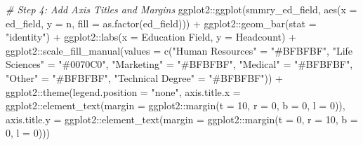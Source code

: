 \documentclass[
]{book}
\newenvironment{Shaded}{\begin{snugshade}}{\end{snugshade}}
\newcommand{\AttributeTok}[1]{\textcolor[rgb]{0.77,0.63,0.00}{#1}}
\newcommand{\CommentTok}[1]{\textcolor[rgb]{0.56,0.35,0.01}{\textit{#1}}}
\newcommand{\DecValTok}[1]{\textcolor[rgb]{0.00,0.00,0.81}{#1}}
\newcommand{\FunctionTok}[1]{\textcolor[rgb]{0.00,0.00,0.00}{#1}}
\newcommand{\NormalTok}[1]{#1}
\newcommand{\OtherTok}[1]{\textcolor[rgb]{0.56,0.35,0.01}{#1}}
\newcommand{\SpecialCharTok}[1]{\textcolor[rgb]{0.00,0.00,0.00}{#1}}
\newcommand{\StringTok}[1]{\textcolor[rgb]{0.31,0.60,0.02}{#1}}
\begin{document}
\begin{Shaded}
\begin{Highlighting}[]
\CommentTok{\# Step 4: Add Axis Titles and Margins}
\NormalTok{ggplot2}\SpecialCharTok{::}\FunctionTok{ggplot}\NormalTok{(smmry\_ed\_field, }\FunctionTok{aes}\NormalTok{(}\AttributeTok{x =}\NormalTok{ ed\_field, }\AttributeTok{y =}\NormalTok{ n, }\AttributeTok{fill =} \FunctionTok{as.factor}\NormalTok{(ed\_field))) }\SpecialCharTok{+}
\NormalTok{ggplot2}\SpecialCharTok{::}\FunctionTok{geom\_bar}\NormalTok{(}\AttributeTok{stat =} \StringTok{"identity"}\NormalTok{) }\SpecialCharTok{+}
\NormalTok{ggplot2}\SpecialCharTok{::}\FunctionTok{labs}\NormalTok{(}\AttributeTok{x =} \StringTok{\textquotesingle{}Education Field\textquotesingle{}}\NormalTok{, }\AttributeTok{y =} \StringTok{\textquotesingle{}Headcount\textquotesingle{}}\NormalTok{) }\SpecialCharTok{+}
\NormalTok{ggplot2}\SpecialCharTok{::}\FunctionTok{scale\_fill\_manual}\NormalTok{(}\AttributeTok{values =} \FunctionTok{c}\NormalTok{(}\StringTok{"Human Resources"} \OtherTok{=} \StringTok{"\#BFBFBF"}\NormalTok{, }
                                      \StringTok{"Life Sciences"} \OtherTok{=} \StringTok{"\#0070C0"}\NormalTok{, }
                                      \StringTok{"Marketing"} \OtherTok{=} \StringTok{"\#BFBFBF"}\NormalTok{, }
                                      \StringTok{"Medical"} \OtherTok{=} \StringTok{"\#BFBFBF"}\NormalTok{,}
                                      \StringTok{"Other"} \OtherTok{=} \StringTok{"\#BFBFBF"}\NormalTok{,}
                                      \StringTok{"Technical Degree"} \OtherTok{=} \StringTok{"\#BFBFBF"}\NormalTok{)) }\SpecialCharTok{+}
\NormalTok{ggplot2}\SpecialCharTok{::}\FunctionTok{theme}\NormalTok{(}\AttributeTok{legend.position =} \StringTok{"none"}\NormalTok{,}
               \AttributeTok{axis.title.x =}\NormalTok{ ggplot2}\SpecialCharTok{::}\FunctionTok{element\_text}\NormalTok{(}\AttributeTok{margin =}\NormalTok{ ggplot2}\SpecialCharTok{::}\FunctionTok{margin}\NormalTok{(}\AttributeTok{t =} \DecValTok{10}\NormalTok{, }\AttributeTok{r =} \DecValTok{0}\NormalTok{, }\AttributeTok{b =} \DecValTok{0}\NormalTok{, }\AttributeTok{l =} \DecValTok{0}\NormalTok{)),}
               \AttributeTok{axis.title.y =}\NormalTok{ ggplot2}\SpecialCharTok{::}\FunctionTok{element\_text}\NormalTok{(}\AttributeTok{margin =}\NormalTok{ ggplot2}\SpecialCharTok{::}\FunctionTok{margin}\NormalTok{(}\AttributeTok{t =} \DecValTok{0}\NormalTok{, }\AttributeTok{r =} \DecValTok{10}\NormalTok{, }\AttributeTok{b =} \DecValTok{0}\NormalTok{, }\AttributeTok{l =} \DecValTok{0}\NormalTok{)))}


\end{Highlighting}
\end{Shaded}
\end{document}
